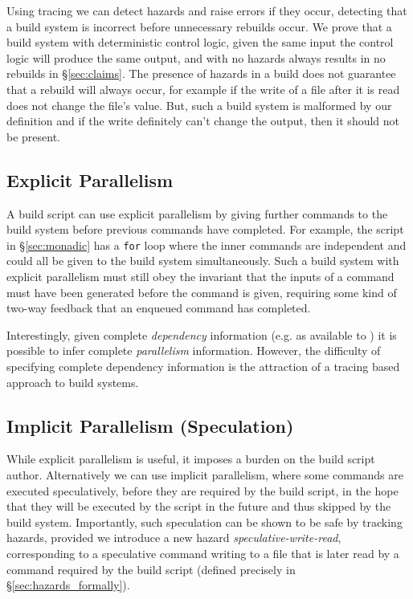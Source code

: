 Using tracing we can detect hazards and raise errors if they occur, detecting that a build system is incorrect before unnecessary rebuilds occur. We prove that a build system with deterministic control logic, given the same input the control logic will produce the same output,  and with no hazards always results in no rebuilds in \S\ref{sec:claims}.  The presence of hazards in a build does not guarantee that a rebuild will always occur, for example if the write of a file after it is read does not change the file's value.  But, such a build system is malformed by our definition and if the write definitely can't change the output, then it should not be present.

\subsection{Explicit Parallelism}
\label{sec:explicit_parallelism}

A build script can use explicit parallelism by giving further commands to the build system before previous commands have completed. For example, the script in \S\ref{sec:monadic} has a \texttt{for} loop where the inner commands are independent and could all be given to the build system simultaneously. Such a build system with explicit parallelism must still obey the invariant that the inputs of a command must have been generated before the command is given, requiring some kind of two-way feedback that an enqueued command has completed.

Interestingly, given complete \emph{dependency} information (e.g. as available to \Make) it is possible to infer complete \emph{parallelism} information. However, the difficulty of specifying complete dependency information is the attraction of a tracing based approach to build systems.

\subsection{Implicit Parallelism (Speculation)}
\label{sec:speculation}

While explicit parallelism is useful, it imposes a burden on the build script author. Alternatively we can use implicit parallelism, where some commands are executed speculatively, before they are required by the build script, in the hope that they will be executed by the script in the future and thus skipped by the build system. Importantly, such speculation can be shown to be safe by tracking hazards, provided we introduce a new hazard \emph{speculative-write-read}, corresponding to a speculative command writing to a file that is later read by a command required by the build script (defined precisely in \S\ref{sec:hazards_formally}).

